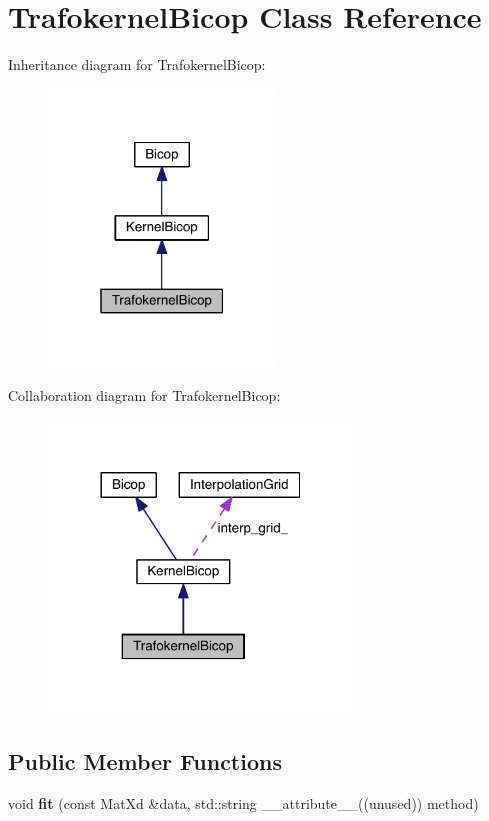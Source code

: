 \hypertarget{class_trafokernel_bicop}{}\section{Trafokernel\+Bicop Class Reference}
\label{class_trafokernel_bicop}


Inheritance diagram for Trafokernel\+Bicop\+:
\nopagebreak
\begin{figure}[H]
\begin{center}
\leavevmode
\includegraphics[width=171pt]{class_trafokernel_bicop__inherit__graph}
\end{center}
\end{figure}


Collaboration diagram for Trafokernel\+Bicop\+:
\nopagebreak
\begin{figure}[H]
\begin{center}
\leavevmode
\includegraphics[width=228pt]{class_trafokernel_bicop__coll__graph}
\end{center}
\end{figure}
\subsection*{Public Member Functions}
\begin{DoxyCompactItemize}
\item 
\mbox{\label{class_trafokernel_bicop_a41e1173fba041779d5800f16fe602022}} 
void {\bfseries fit} (const Mat\+Xd \&data, std\+::string \+\_\+\+\_\+attribute\+\_\+\+\_\+((unused)) method)
\end{DoxyCompactItemize}
